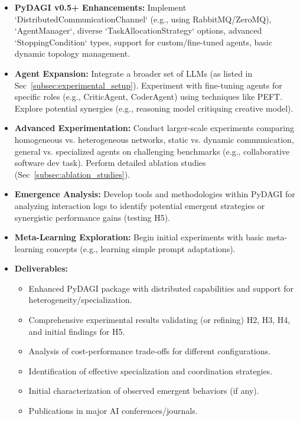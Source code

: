 \documentclass[12pt]{amsart}
\begin{document}
\begin{itemize}[leftmargin=*]
    \item \textbf{PyDAGI v0.5+ Enhancements:} Implement `DistributedCommunicationChannel` (e.g., using RabbitMQ/ZeroMQ), `AgentManager`, diverse `TaskAllocationStrategy` options, advanced `StoppingCondition` types, support for custom/fine-tuned agents, basic dynamic topology management.
    \item \textbf{Agent Expansion:} Integrate a broader set of LLMs (as listed in Sec~\ref{subsec:experimental_setup}). Experiment with fine-tuning agents for specific roles (e.g., CriticAgent, CoderAgent) using techniques like PEFT. Explore potential synergies (e.g., reasoning model critiquing creative model).
    \item \textbf{Advanced Experimentation:} Conduct larger-scale experiments comparing homogeneous vs. heterogeneous networks, static vs. dynamic communication, general vs. specialized agents on challenging benchmarks (e.g., collaborative software dev task). Perform detailed ablation studies (Sec~\ref{subsec:ablation_studies}).
    \item \textbf{Emergence Analysis:} Develop tools and methodologies within PyDAGI for analyzing interaction logs to identify potential emergent strategies or synergistic performance gains (testing H5).
    \item \textbf{Meta-Learning Exploration:} Begin initial experiments with basic meta-learning concepts (e.g., learning simple prompt adaptations).
    \item \textbf{Deliverables:}
        \begin{itemize}
            \item Enhanced PyDAGI package with distributed capabilities and support for heterogeneity/specialization.
            \item Comprehensive experimental results validating (or refining) H2, H3, H4, and initial findings for H5.
            \item Analysis of cost-performance trade-offs for different configurations.
            \item Identification of effective specialization and coordination strategies.
            \item Initial characterization of observed emergent behaviors (if any).
            \item Publications in major AI conferences/journals.
        \end{itemize}
\end{itemize}
\end{document}
